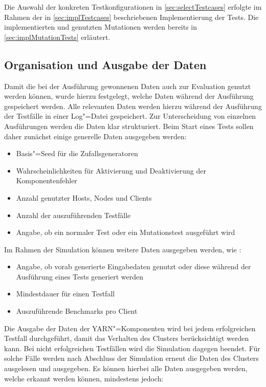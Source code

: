 Die Auswahl der konkreten Testkonfigurationen in \cref{sec:selectTestcases} erfolgte im Rahmen der in \cref{sec:implTestcases} beschriebenen Implementierung der Tests.
Die implementierten und genutzten Mutationen werden bereits in \cref{sec:implMutationTests} erläutert.

\subsection{Organisation und Ausgabe der Daten}
\label{subsec:dataOrganisation}

Damit die bei der Ausführung gewonnenen Daten auch zur Evaluation genutzt werden können, wurde hierzu festgelegt, welche Daten während der Ausführung gespeichert werden.
Alle relevanten Daten werden hierzu während der Ausführung der Testfälle in einer Log"=Datei gespeichert.
Zur Unterscheidung von einzelnen Ausführungen werden die Daten klar strukturiert.
Beim Start eines Tests sollen daher zunächst einige generelle Daten ausgegeben werden:

\begin{itemize}
    \item Basis"=Seed für die Zufallsgeneratoren
    \item Wahrscheinlichkeiten für Aktivierung und Deaktivierung der Komponentenfehler
    \item Anzahl genutzter Hosts, Nodes und Clients
    \item Anzahl der auszuführenden Testfälle
    \item Angabe, ob ein normaler Test oder ein Mutationstest ausgeführt wird
\end{itemize}

Im Rahmen der Simulation können weitere Daten ausgegeben werden, wie \zB:

\begin{itemize}
    \item Angabe, ob vorab generierte Eingabedaten genutzt oder diese während der Ausführung eines Tests generiert werden
    \item Mindestdauer für einen Testfall
    \item Auszuführende Benchmarks pro Client
\end{itemize}

Die Ausgabe der Daten der YARN"=Komponenten wird bei jedem erfolgreichen Testfall durchgeführt, damit das Verhalten des Clusters berücksichtigt werden kann.
Bei nicht erfolgreichen Testfällen wird die Simulation dagegen beendet.
Für solche Fälle werden nach Abschluss der Simulation erneut die Daten des Clusters ausgelesen und ausgegeben.
Es können hierbei alle Daten ausgegeben werden, welche erkannt werden können, mindestens jedoch:

